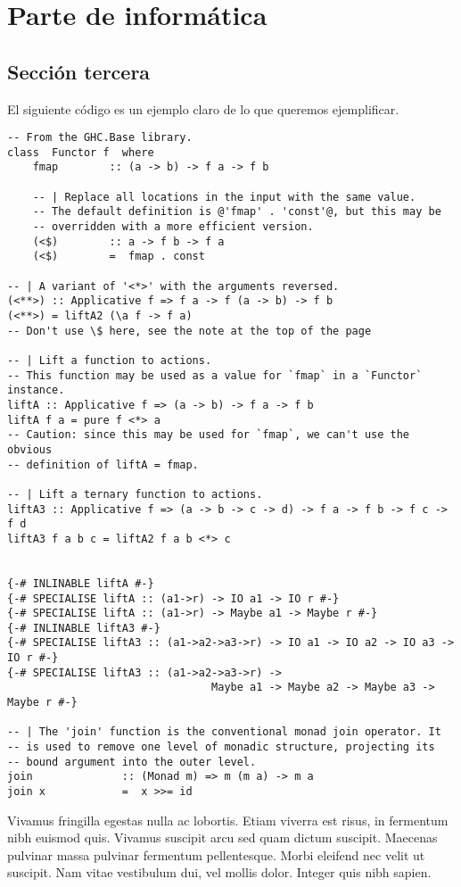 \documentclass[oneside,openright,titlepage,numbers=noenddot,openany,headinclude,footinclude=true,
cleardoublepage=empty,abstractoff,BCOR=5mm,paper=a4,fontsize=12pt,ngerman,american,spanish]{scrreprt}
\begin{document}

\part{Parte de informática}
\chapter{Sección tercera}
El siguiente código es un ejemplo claro de lo que queremos
ejemplificar.

\begin{verbatim}
-- From the GHC.Base library.
class  Functor f  where
    fmap        :: (a -> b) -> f a -> f b

    -- | Replace all locations in the input with the same value.
    -- The default definition is @'fmap' . 'const'@, but this may be
    -- overridden with a more efficient version.
    (<$)        :: a -> f b -> f a
    (<$)        =  fmap . const

-- | A variant of '<*>' with the arguments reversed.
(<**>) :: Applicative f => f a -> f (a -> b) -> f b
(<**>) = liftA2 (\a f -> f a)
-- Don't use \$ here, see the note at the top of the page

-- | Lift a function to actions.
-- This function may be used as a value for `fmap` in a `Functor` instance.
liftA :: Applicative f => (a -> b) -> f a -> f b
liftA f a = pure f <*> a
-- Caution: since this may be used for `fmap`, we can't use the obvious
-- definition of liftA = fmap.

-- | Lift a ternary function to actions.
liftA3 :: Applicative f => (a -> b -> c -> d) -> f a -> f b -> f c -> f d
liftA3 f a b c = liftA2 f a b <*> c


{-# INLINABLE liftA #-}
{-# SPECIALISE liftA :: (a1->r) -> IO a1 -> IO r #-}
{-# SPECIALISE liftA :: (a1->r) -> Maybe a1 -> Maybe r #-}
{-# INLINABLE liftA3 #-}
{-# SPECIALISE liftA3 :: (a1->a2->a3->r) -> IO a1 -> IO a2 -> IO a3 -> IO r #-}
{-# SPECIALISE liftA3 :: (a1->a2->a3->r) ->
                                Maybe a1 -> Maybe a2 -> Maybe a3 -> Maybe r #-}

-- | The 'join' function is the conventional monad join operator. It
-- is used to remove one level of monadic structure, projecting its
-- bound argument into the outer level.
join              :: (Monad m) => m (m a) -> m a
join x            =  x >>= id
\end{verbatim}

Vivamus fringilla egestas nulla ac lobortis. Etiam viverra est risus,
in fermentum nibh euismod quis. Vivamus suscipit arcu sed quam dictum
suscipit. Maecenas pulvinar massa pulvinar fermentum
pellentesque. Morbi eleifend nec velit ut suscipit. Nam vitae
vestibulum dui, vel mollis dolor. Integer quis nibh sapien.




\end{document}
